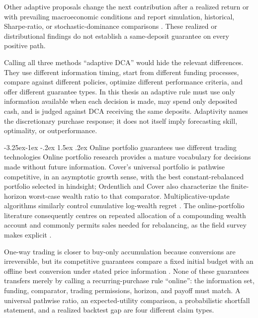 \documentclass[12pt,a4paper,oneside]{report}
\makeatletter
\renewcommand\subsection{\@startsection{subsection}{2}{\z@}%
  {-3.25ex\@plus -1ex \@minus -.2ex}%
  {1.5ex \@plus .2ex}%
  {\normalfont\fontsize{12}{15}\selectfont\bfseries}}
\makeatother
\begin{document}
Other adaptive proposals change the next contribution after a realized return
or with prevailing macroeconomic conditions and report simulation, historical,
Sharpe-ratio, or stochastic-dominance comparisons
\citep{dunhamfriesen2012,kapalczynskilien2021}. These realized or distributional
findings do not establish a same-deposit guarantee on every positive path.

Calling all three methods ``adaptive DCA'' would hide the relevant differences.
They use different information timing, start from different funding processes,
compare against different policies, optimize different performance criteria,
and offer different guarantee types. In this thesis an adaptive rule must use
only information available when each decision is made, may spend only deposited
cash, and is judged against DCA receiving the same deposits. Adaptivity names
the discretionary purchase response; it does not itself imply forecasting
skill, optimality, or outperformance.

\subsection{Online portfolio guarantees use different trading technologies}
\label{sec:lit-online-decisions}
Online portfolio research provides a mature vocabulary for decisions made
without future information. Cover's universal portfolio is pathwise
competitive, in an asymptotic growth sense, with the best constant-rebalanced
portfolio selected in hindsight; Ordentlich and Cover also characterize the
finite-horizon worst-case wealth ratio to that comparator. Multiplicative-update
algorithms similarly control cumulative log-wealth regret
\citep{cover1991,ordentlichcover1998,helmbold1998}. The online-portfolio literature consequently
centres on repeated allocation of a compounding wealth account and commonly
permits sales needed for rebalancing, as the field survey makes explicit
\citep{lihoi2014}.

One-way trading is closer to buy-only accumulation because conversions are
irreversible, but its competitive guarantees compare a fixed initial budget
with an offline best conversion under stated price information
\citep{elyaniv2001}. None of these guarantees transfers merely by calling a
recurring-purchase rule ``online'': the information set, funding, comparator,
trading permissions, horizon, and payoff must match. A universal pathwise
ratio, an expected-utility comparison, a probabilistic shortfall statement,
and a realized backtest gap are four different claim types.
\end{document}
